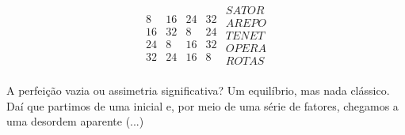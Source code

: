 \vspace*{\fill}
\begin{minipage}{\textwidth}

\[
\begin{array}{cccc}
8 & 16 & 24 & 32  \\
16 & 32 & 8 & 24 \\
24 & 8 & 16 & 32 \\
32 & 24 & 16 & 8\end{array}
%
 \begin{array}{c}
SATOR \\
AREPO \\
TENET \\
OPERA \\
ROTAS \\
\end{array}
\]
\end{minipage}
\vfill

\begin{flushleft}A perfeição vazia ou assimetria significativa? Um equilíbrio, mas nada clássico. Daí que partimos de uma inicial e, por meio de uma série de fatores, chegamos a uma desordem aparente (...)\end{flushleft}
